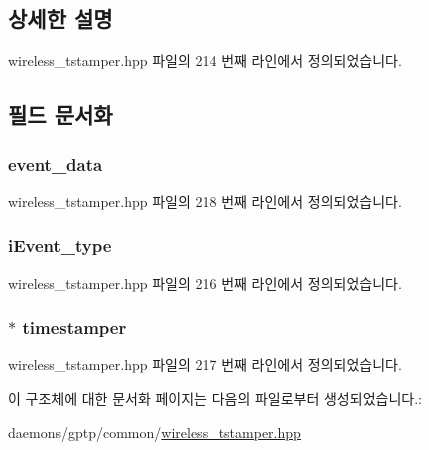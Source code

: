 \subsection{상세한 설명}


wireless\+\_\+tstamper.\+hpp 파일의 214 번째 라인에서 정의되었습니다.



\subsection{필드 문서화}
\subsubsection[{\texorpdfstring{event\+\_\+data}{event_data}}]{ event\+\_\+data}\hypertarget{struct_wireless_timestamper_callback_arg_a0cb3aa66097f2f3c9bafc9aeb88b4c9c}{}\label{struct_wireless_timestamper_callback_arg_a0cb3aa66097f2f3c9bafc9aeb88b4c9c}


wireless\+\_\+tstamper.\+hpp 파일의 218 번째 라인에서 정의되었습니다.

\subsubsection[{\texorpdfstring{i\+Event\+\_\+type}{iEvent_type}}]{ i\+Event\+\_\+type}\hypertarget{struct_wireless_timestamper_callback_arg_a73268234eb2338c6296c2b78e4685a66}{}\label{struct_wireless_timestamper_callback_arg_a73268234eb2338c6296c2b78e4685a66}


wireless\+\_\+tstamper.\+hpp 파일의 216 번째 라인에서 정의되었습니다.

\subsubsection[{\texorpdfstring{timestamper}{timestamper}}]{$\ast$ timestamper}\hypertarget{struct_wireless_timestamper_callback_arg_a63b4bb264af088830cdb1fea4e6ad126}{}\label{struct_wireless_timestamper_callback_arg_a63b4bb264af088830cdb1fea4e6ad126}


wireless\+\_\+tstamper.\+hpp 파일의 217 번째 라인에서 정의되었습니다.



이 구조체에 대한 문서화 페이지는 다음의 파일로부터 생성되었습니다.\+:\begin{DoxyCompactItemize}
\item 
daemons/gptp/common/\hyperlink{wireless__tstamper_8hpp}{wireless\+\_\+tstamper.\+hpp}\end{DoxyCompactItemize}
